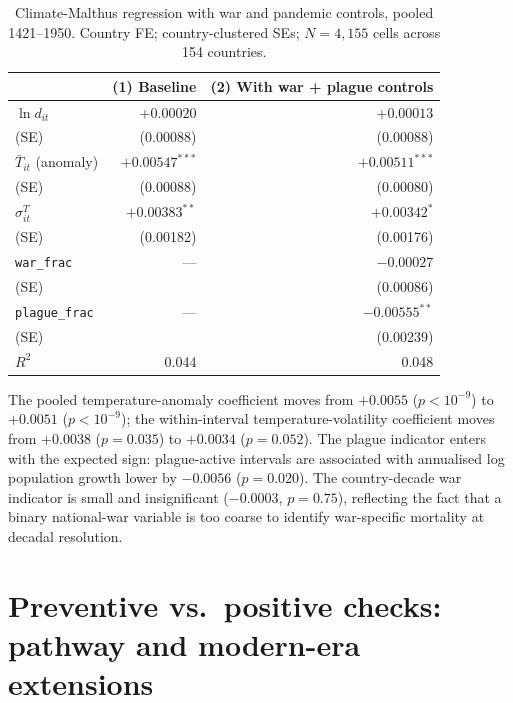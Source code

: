 \documentclass[11pt,letterpaper]{article}
\begin{document}
\begin{table}[H]
\centering
\caption{Climate-Malthus regression with war and pandemic controls, pooled 1421--1950. Country FE; country-clustered SEs; $N=4{,}155$ cells across 154 countries.}
\label{tab:malthus-conflict}
\small
\begin{tabular}{lrr}
\toprule
 & (1) Baseline & (2) With war + plague controls \\
\midrule
$\ln d_{it}$                          & $+0.00020$       & $+0.00013$       \\
\quad (SE)                              & (0.00088)        & (0.00088)        \\
$\bar T_{it}$ (anomaly)                & $+0.00547^{***}$ & $+0.00511^{***}$ \\
\quad (SE)                              & (0.00088)        & (0.00080)        \\
$\sigma^T_{it}$                        & $+0.00383^{**}$  & $+0.00342^{*}$   \\
\quad (SE)                              & (0.00182)        & (0.00176)        \\
\texttt{war\_frac}                     & ---              & $-0.00027$        \\
\quad (SE)                              &                  & (0.00086)         \\
\texttt{plague\_frac}                  & ---              & $-0.00555^{**}$   \\
\quad (SE)                              &                  & (0.00239)         \\
\midrule
$R^2$                                  & 0.044             & 0.048              \\
\bottomrule
\end{tabular}
\end{table}

The pooled temperature-anomaly coefficient moves from $+0.0055$ ($p<10^{-9}$) to $+0.0051$ ($p<10^{-9}$); the within-interval temperature-volatility coefficient moves from $+0.0038$ ($p=0.035$) to $+0.0034$ ($p=0.052$). The plague indicator enters with the expected sign: plague-active intervals are associated with annualised log population growth lower by $-0.0056$ ($p=0.020$). The country-decade war indicator is small and insignificant ($-0.0003$, $p=0.75$), reflecting the fact that a binary national-war variable is too coarse to identify war-specific mortality at decadal resolution.

\section{Preventive vs.\ positive checks: pathway and modern-era extensions}
\label{app:prevpos-extensions}
\end{document}
